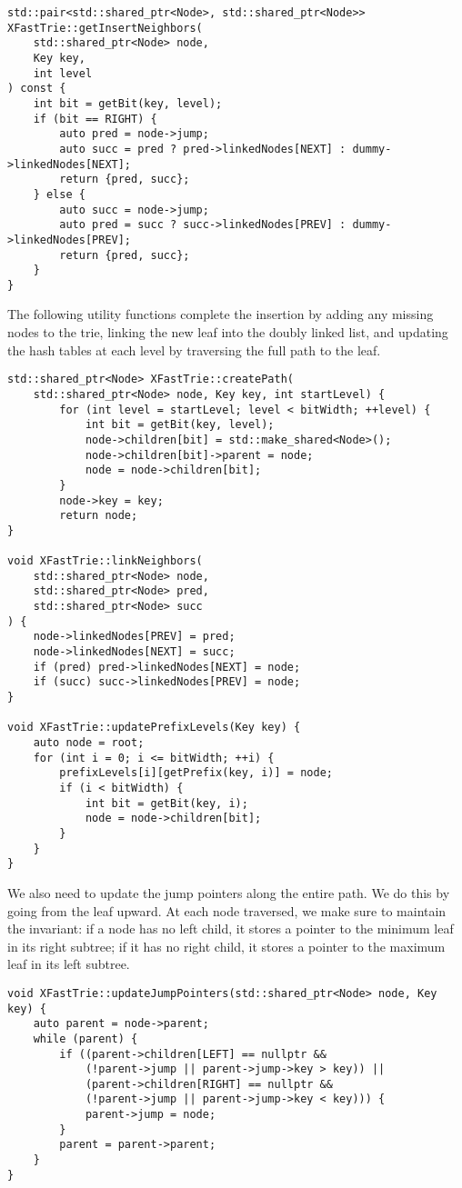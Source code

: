 \begin{verbatim}
std::pair<std::shared_ptr<Node>, std::shared_ptr<Node>> 
XFastTrie::getInsertNeighbors(
    std::shared_ptr<Node> node,
    Key key,
    int level
) const {
    int bit = getBit(key, level);
    if (bit == RIGHT) {
        auto pred = node->jump;
        auto succ = pred ? pred->linkedNodes[NEXT] : dummy->linkedNodes[NEXT];
        return {pred, succ};
    } else {
        auto succ = node->jump;
        auto pred = succ ? succ->linkedNodes[PREV] : dummy->linkedNodes[PREV];
        return {pred, succ};
    }
}
\end{verbatim}

The following utility functions complete the insertion by adding any missing nodes to the trie, linking the new leaf into the doubly linked list, and updating the hash tables at each level by traversing the full path to the leaf.

\begin{verbatim}
std::shared_ptr<Node> XFastTrie::createPath(
    std::shared_ptr<Node> node, Key key, int startLevel) {
        for (int level = startLevel; level < bitWidth; ++level) {
            int bit = getBit(key, level);
            node->children[bit] = std::make_shared<Node>();
            node->children[bit]->parent = node;
            node = node->children[bit];
        }
        node->key = key;
        return node;
}

void XFastTrie::linkNeighbors(
    std::shared_ptr<Node> node,
    std::shared_ptr<Node> pred,
    std::shared_ptr<Node> succ
) {
    node->linkedNodes[PREV] = pred;
    node->linkedNodes[NEXT] = succ;
    if (pred) pred->linkedNodes[NEXT] = node;
    if (succ) succ->linkedNodes[PREV] = node;
}

void XFastTrie::updatePrefixLevels(Key key) {
    auto node = root;
    for (int i = 0; i <= bitWidth; ++i) {
        prefixLevels[i][getPrefix(key, i)] = node;
        if (i < bitWidth) {
            int bit = getBit(key, i);
            node = node->children[bit];
        }
    }
}
\end{verbatim}

We also need to update the jump pointers along the entire path. We do this by going from the leaf upward. At each node traversed, we make sure to maintain the invariant: if a node has no left child, it stores a pointer to the minimum leaf in its right subtree; if it has no right child, it stores a pointer to the maximum leaf in its left subtree.

\begin{verbatim}
void XFastTrie::updateJumpPointers(std::shared_ptr<Node> node, Key key) {
    auto parent = node->parent;
    while (parent) {
        if ((parent->children[LEFT] == nullptr && 
            (!parent->jump || parent->jump->key > key)) ||
            (parent->children[RIGHT] == nullptr && 
            (!parent->jump || parent->jump->key < key))) {
            parent->jump = node;
        }
        parent = parent->parent;
    }
}
\end{verbatim}

